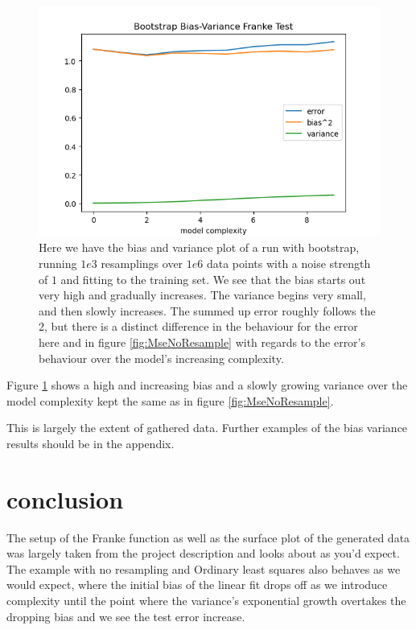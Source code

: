 \documentclass[15pt comic sans]{revtex4-2}
\begin{document}
\begin{figure}[hbtp]
\includegraphics[scale=0.7]{
	../plots/frankeBootstrapBiasVariancesigma1poly10boot1e3datapt1e6test.png}
\caption{
	Here we have the bias and variance plot of a run with bootstrap, running $1e3$ 
	resamplings over $1e6$ data points with a noise strength of $1$ and fitting to the training
	set. We see that the bias starts out very high and gradually increases. The variance begins 
	very small, and then slowly increases. The summed up error roughly follows the 2, but there 
	is a distinct difference in the behaviour for the error here and in figure 
	\ref{fig:MseNoResample} with regards to the error's behaviour over the model's increasing 
	complexity. 
	}
\label{fig:BootstrapBiasVariance1e6test}
\end{figure}
Figure \ref{fig:BootstrapBiasVariance1e6test} shows a high and increasing bias and a slowly
growing variance over the model complexity kept the same as in figure 
\ref{fig:MseNoResample}.

This is largely the extent of gathered data. Further examples of the bias variance 
results should be in the appendix. 

\section{conclusion}

The setup of the Franke function as well as the surface plot of the generated data was 
largely taken from the project description and looks about as you'd expect. The example 
with no resampling and Ordinary least squares also behaves as we would expect, where the 
initial bias of the linear fit drops off as we introduce complexity until the point 
where the variance's exponential growth overtakes the dropping bias and we see the test 
error increase. \\
\end{document}

